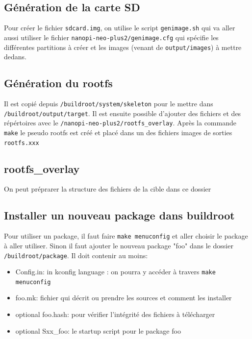 \subsection{Génération de la carte SD}
Pour créer le fichier \verb!sdcard.img!, on utilise le script \verb!genimage.sh! qui va aller aussi utiliser le fichier \verb!nanopi-neo-plus2/genimage.cfg! qui spécifie les différentes partitions à créer et les images (venant de \verb!output/images!) à mettre dedans.

\subsection{Génération du rootfs}
Il est copié depuis \verb!/buildroot/system/skeleton! pour le mettre dans \verb!/buildroot/output/target!. Il est ensuite possible d'ajouter des fichiers et des répértoires avec le \verb!/nanopi-neo-plus2/rootfs_overlay!. Après la commande \verb!make! le pseudo rootfs est créé et placé dans un des fichiers images de sorties \verb!rootfs.xxx!

\subsection{rootfs\_overlay}
On peut préprarer la structure des fichiers de la cible dans ce dossier

\subsection{Installer un nouveau package dans buildroot}
Pour utiliser un package, il faut faire \verb!make menuconfig! et aller choisir le package à aller utiliser. Sinon il faut ajouter le nouveau package "foo" dans le dossier \verb!/buildroot/package!. Il doit contenir au moins:
\begin{itemize}
\item Config.in: in kconfig language : on pourra y accéder à travers \verb!make menuconfig!
\item foo.mk: fichier qui décrit ou prendre les sources et comment les installer
\item optional foo.hash: pour vérifier l'intégrité des fichiers à télécharger
\item optional Sxx\_foo: le startup script pour le package foo
\end{itemize}